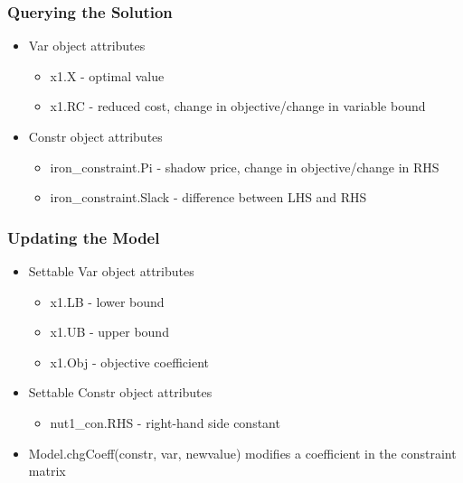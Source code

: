 \documentclass[12pt,handout]{beamer}
\begin{document}
\begin{frame}
\frametitle{Querying the Solution}
\begin{itemize}
\item Var object attributes
    \begin{itemize}
    \item x1.X - optimal value
    \item x1.RC - reduced cost, change in objective/change in variable bound
    \end{itemize}
\item Constr object attributes
    \begin{itemize}
    \item iron_constraint.Pi - shadow price, change in objective/change in RHS
    \item iron_constraint.Slack - difference between LHS and RHS
    \end{itemize}
\end{itemize}
\end{frame}

\begin{frame}
\frametitle{Updating the Model}
\begin{itemize}
\item Settable Var object attributes
    \begin{itemize}
    \item x1.LB - lower bound
    \item x1.UB - upper bound
    \item x1.Obj - objective coefficient
    \end{itemize}
\item Settable Constr object attributes
    \begin{itemize}
    \item nut1\_con.RHS - right-hand side constant
    \end{itemize}
\item Model.chgCoeff(constr, var, newvalue) modifies a coefficient in the constraint matrix
\end{itemize}
\end{frame}
\end{document}
